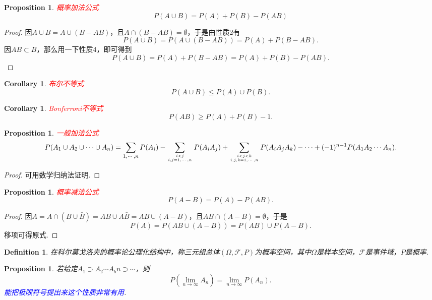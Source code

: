 \documentclass{article}
\newtheorem{corollary}[theorem]{Corollary}
\newtheorem{proposition}[theorem]{Proposition}
\newtheorem{definition}[theorem]{Definition}
\newcommand{\redt}[1]{\textcolor{red}{#1}}
\newcommand{\bluet}[1]{\textcolor{blue}{#1}}
\begin{document}
\begin{proposition}
\rm \redt{概率加法公式}
$$
P(A \cup B) = P(A) + P(B) - P(AB) 
$$
\end{proposition}

\begin{proof}
因$A \cup B = A \cup (B - AB)$，且$A \cap (B-AB) = \emptyset$，于是由性质2有
$$
P(A \cup B) = P(A \cup (B-AB)) = P(A) + P(B-AB).
$$
因$AB \subset B$，那么用一下性质4，即可得到
$$
P(A \cup B) = P(A) + P(B-AB) = P(A) + P(B) - P(AB).
$$
\end{proof}

\begin{corollary}
\rm \redt{布尔不等式}
$$
P(A \cup B) \leq P(A) \cup P(B).
$$
\end{corollary}

\begin{corollary}
\rm \redt{Bonferroni不等式}
$$
P(AB) \geq P(A) + P(B) -1.
$$
\end{corollary}

\begin{proposition}
\rm \redt{一般加法公式}
$$
P(A_1 \cup A_2 \cup \cdots \cup A_n) = \sum\limits_{1,\cdots,n} P(A_i) - \sum\limits_{i < j \atop i,j = 1,\cdots,n}P(A_iA_j) +  \sum\limits_{i < j < k \atop i,j,k = 1,\cdots,n}P(A_iA_jA_k) - \cdots + (-1)^{n-1}P(A_1A_2\cdots A_n). 
$$
\end{proposition}

\begin{proof}
可用数学归纳法证明. 
\end{proof}

\begin{proposition}
\rm \redt{概率减法公式} 
$$
P(A - B) = P(A) - P(AB).
$$
\end{proposition}

\begin{proof}
因$A = A\cap (B \cup \bar{B}) = AB \cup A\bar{B} = AB \cup (A-B)$，且$AB \cap (A-B) = \emptyset$，于是
$$
P(A) = P(AB \cup (A-B)) = P(AB) \cup P(A-B). 
$$
移项可得原式. 
\end{proof}

\begin{definition}
\rm 在科尔莫戈洛夫的概率论公理化结构中，称三元组总体$(\Omega,\mathscr{F}, P)$为{\color{red}概率空间}，其中$\Omega$是样本空间，$\mathscr{F}$是事件域，$P$是概率. 
\end{definition}


\begin{proposition}\label{probability-axiom: lemma1}
\rm 若给定$A_1 \supset A_2 \cdots A_bn \supset \cdots$，则
$$
P(\lim\limits_{n \to \infty} A_n) = \lim\limits_{n \to \infty} P(A_n). 
$$
\bluet{能把极限符号提出来这个性质非常有用}. 
\end{proposition}
\end{document}
